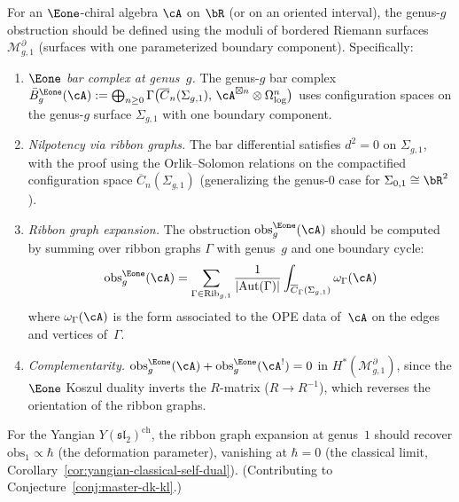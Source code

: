 \begin{conjecture}\label{conj:e1-genus-theory}
For an $\Eone$-chiral algebra $\cA$ on $\bR$
(or on an oriented interval), the genus-$g$ obstruction
should be defined using the moduli of bordered Riemann
surfaces $\mathcal{M}_{g,1}^{\partial}$
(surfaces with one parameterized boundary component).
Specifically:
\begin{enumerate}[label=\textup{(\roman*)}]
\item \emph{$\Eone$ bar complex at genus~$g$.}
The genus-$g$ bar complex
$\bar{B}_g^{\Eone}(\cA) :=
\bigoplus_{n \geq 0} \Gamma\bigl(
\overline{C}_n(\Sigma_{g,1}),\,
\cA^{\boxtimes n} \otimes
\Omega^n_{\log}\bigr)$
uses configuration spaces on the genus-$g$
surface $\Sigma_{g,1}$ with one boundary component.
\item \emph{Nilpotency via ribbon graphs.}
The bar differential satisfies $d^2 = 0$ on
$\Sigma_{g,1}$, with the proof using the
Orlik--Solomon relations on the
compactified configuration space
$\overline{C}_n(\Sigma_{g,1})$
(generalizing the genus-$0$ case for
$\Sigma_{0,1} \cong \bR^2$).
\item \emph{Ribbon graph expansion.}
The obstruction $\mathrm{obs}_g^{\Eone}(\cA)$
should be computed by summing over ribbon graphs
$\Gamma$ with genus~$g$ and one boundary cycle:
\[
\mathrm{obs}_g^{\Eone}(\cA) =
\sum_{\Gamma \in \mathrm{Rib}_{g,1}}
\frac{1}{|\mathrm{Aut}(\Gamma)|}
\int_{\overline{C}_\Gamma(\Sigma_{g,1})}
\omega_\Gamma(\cA)
\]
where $\omega_\Gamma(\cA)$ is the form
associated to the OPE data of~$\cA$ on the
edges and vertices of~$\Gamma$.
\item \emph{Complementarity.}
$\mathrm{obs}_g^{\Eone}(\cA) +
\mathrm{obs}_g^{\Eone}(\cA^!) = 0$
in $H^*(\mathcal{M}_{g,1}^{\partial})$,
since the $\Eone$ Koszul duality inverts
the $R$-matrix ($R \to R^{-1}$), which
reverses the orientation of the ribbon
graphs.
\end{enumerate}
For the Yangian $Y(\mathfrak{sl}_2)^{\mathrm{ch}}$,
the ribbon graph expansion at genus~$1$ should recover
$\mathrm{obs}_1 \propto \hbar$ (the deformation parameter),
vanishing at $\hbar = 0$ (the classical limit,
Corollary~\textup{\ref{cor:yangian-classical-self-dual}}).
(Contributing to Conjecture~\ref{conj:master-dk-kl}.)
\end{conjecture}

